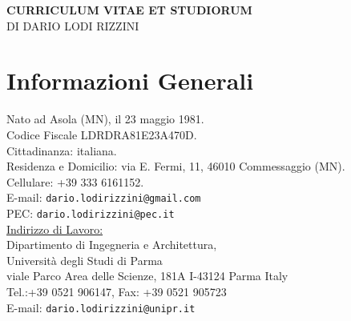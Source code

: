 \documentclass[11pt]{article}
\begin{document}

\nocite{
saccuti2026tfr,
monica2024tvcg,saccuti2025data,
penzotti2023compag,
lodirizzini2022ral,
aleotti2021ap,
lodirizzini2019ral,galasso2019rcim,
lodirizzini2018pr,simetti2018joe,
kallasi2017ras,lodirizzini2017caee, 
casalino2016mtsj, kallasi2016ral, 
lodirizzini2015ijars, 
aleotti2014jirs, cigolini2014jamris, 
lodirizzini2009ras, 
%
pasetti2026iros,saccuti2026fmpmsa,
saccuti2025irc,panicieri2025iccp,
monica2024etfa,
fontana2023icraws,penzotti2023ecpa,
khan2022irc,lodirizzini2022raad,
fontana2021ecmr,fontana2021iccp,khan2021iccp,
monica2020irc,chiaravalli2020etfa,amoretti2020smartsys,
lodirizzini2018irosws,
lodirizzini2017iros, 
kallasi2016iros, oleari2016iecon,
kallasi2015oceans, oleari2015oceans,
aleotti2014iros, oleari2014ifac, lodirizzini2014ias, kallasi2014iarp,
lodirizzini2013ecmr, valeriani2013acra, oleari2013iccp, 
aleotti2012icra, lodirizzini2012icinco, calo2012icinco, 
lodirizzini2011icra, 
lodirizzini2010iros, argenti2010isr, 
lodirizzini2009iros, lodirizzini2009ecmr, lodirizzini2009icar, 
grisetti2008icra, lodirizzini2008ciras, 
lodirizzini2007ecmr, lodirizzini2007icinco, 
%
lodirizzini2021simai,khan2020irim,kallasi2014amra, lodirizzini2012icraworkshop, 
lodirizzini2010graphbot, lodirizzini2009icraworkshop, cerri2007ccmvs,
%
lodirizzini2008improved,
lodirizzini2009thesis}


\begin{center}
\textbf{\LARGE CURRICULUM VITAE ET STUDIORUM} \\
{\Large DI DARIO LODI RIZZINI}
\end{center}


\section{Informazioni Generali} 

{\small
Nato ad Asola (MN), il 23 maggio 1981. \\
Codice Fiscale LDRDRA81E23A470D. \\
Cittadinanza: italiana. \\
Residenza e Domicilio: via E. Fermi, 11, 46010 Commessaggio (MN). \\
Cellulare: +39 333 6161152. \\
E-mail: \verb|dario.lodirizzini@gmail.com|\\
PEC: \verb|dario.lodirizzini@pec.it|\\

\noindent \ul{Indirizzo di Lavoro:}\\
Dipartimento di Ingegneria e Architettura,\\
Universit\`a degli Studi di Parma\\
viale Parco Area delle Scienze, 181A I-43124 Parma Italy\\
Tel.:+39 0521 906147, Fax: +39 0521 905723\\
E-mail: \verb|dario.lodirizzini@unipr.it|\\
}
\end{document}

